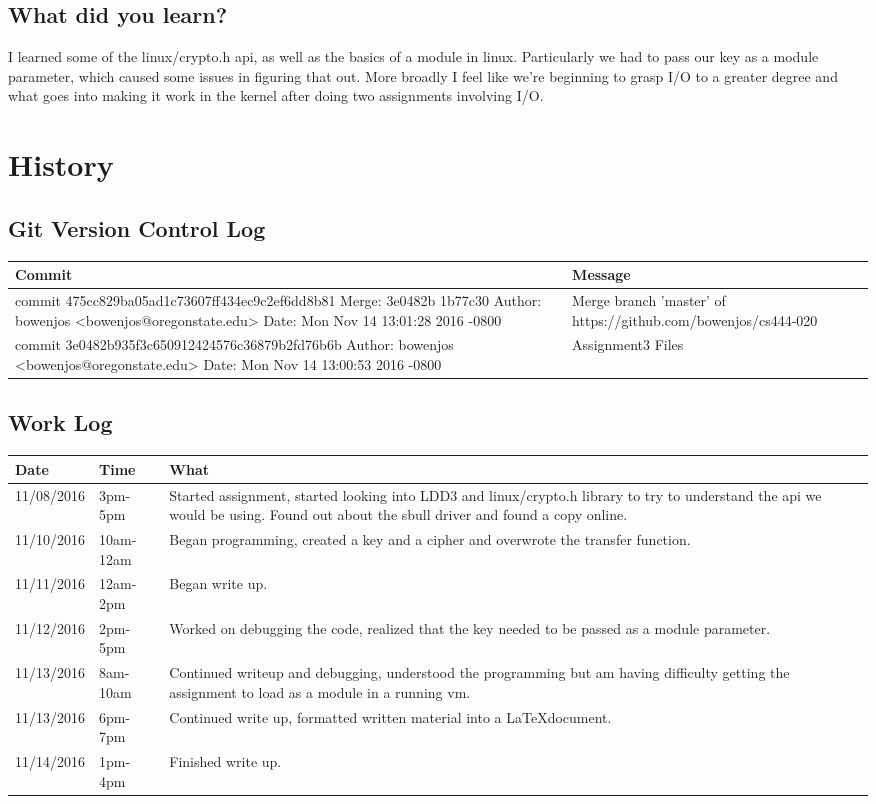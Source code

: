 \documentclass[letterpaper,10pt,titlepage]{article}
\begin{document}
\subsection{What did you learn?}

\sloppy I learned some of the linux/crypto.h api, as well as the basics of a module in linux. Particularly we had to pass our key as a module parameter, which caused some issues in figuring that out. More broadly I feel like we’re beginning to grasp I/O to a greater degree and what goes into making it work in the kernel after doing two assignments involving I/O. 


\section {History}
\subsection {Git Version Control Log}
\begin{tabular}{ |p{10cm}|p{3cm}| } 
 \hline
 Commit & Message \\
 \hline

commit 475cc829ba05ad1c73607ff434ec9c2ef6dd8b81
Merge: 3e0482b 1b77c30
Author: bowenjos <bowenjos@oregonstate.edu>
Date:   Mon Nov 14 13:01:28 2016 -0800
&
    Merge branch 'master' of https://github.com/bowenjos/cs444-020\\
\hline

commit 3e0482b935f3c650912424576c36879b2fd76b6b
Author: bowenjos <bowenjos@oregonstate.edu>
Date:   Mon Nov 14 13:00:53 2016 -0800
&
    Assignment3 Files\\
\hline

\end{tabular}

\subsection{Work Log}
\begin{tabular}{ |p{3cm}|p{3cm}|p{5cm}| } 
\hline
Date & Time & What \\
\hline
11/08/2016& 3pm-5pm&Started assignment, started looking into LDD3 and linux/crypto.h library to try to understand the api we would be using. Found out about the sbull driver and found a copy online. \\
 \hline
 11/10/2016& 10am-12am& Began programming, created a key and a cipher and overwrote the transfer function. \\
\hline
11/11/2016& 12am-2pm& Began write up. \\
\hline
11/12/2016& 2pm-5pm& Worked on debugging the code, realized that the key needed to be passed as a module parameter. \\
\hline
11/13/2016& 8am-10am& Continued writeup and debugging, understood the programming but am having difficulty getting the assignment to load as a module in a running vm. \\
\hline
11/13/2016& 6pm-7pm& Continued write up, formatted written material into a \LaTeX document.\\ 
\hline
11/14/2016& 1pm-4pm &Finished write up.\\
 \hline
\end{tabular}
\end{document}
